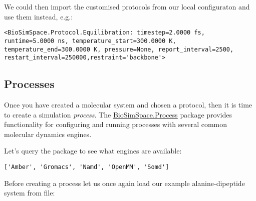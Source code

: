 We could then import the customised protocols from our local
configuraton and use them instead, e.g.:

\begin{Shaded}
\begin{Highlighting}[]
 \OperatorTok{*}

\OperatorTok{=}
\end{Highlighting}
\end{Shaded}

\begin{verbatim}
<BioSimSpace.Protocol.Equilibration: timestep=2.0000 fs, runtime=5.0000 ns, temperature_start=300.0000 K, temperature_end=300.0000 K, pressure=None, report_interval=2500, restart_interval=250000,restraint='backbone'>
\end{verbatim}

\hypertarget{processes}{%
\subsection{Processes}\label{processes}}

Once you have created a molecular system and chosen a protocol, then it
is time to create a simulation \emph{process}. The
\href{https://biosimspace.org/api/index_Process.html}{BioSimSpace.Process}
package provides functionality for configuring and running processes
with several common molecular dynamics engines.

Let's query the package to see what engines are available:

\begin{Shaded}
\begin{Highlighting}[]
\end{Highlighting}
\end{Shaded}

\begin{verbatim}
['Amber', 'Gromacs', 'Namd', 'OpenMM', 'Somd']
\end{verbatim}

Before creating a process let us once again load our example
alanine-dipeptide system from file:

\begin{Shaded}
\begin{Highlighting}[]
\OperatorTok{=}\NormalTok{)}
\end{Highlighting}
\end{Shaded}

